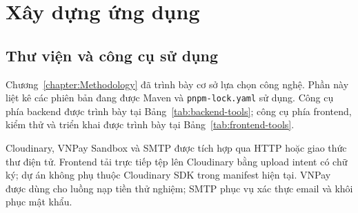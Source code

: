 \documentclass[../DoAn.tex]{subfiles}
\begin{document}
\FloatBarrier
\section{Xây dựng ứng dụng}

\subsection{Thư viện và công cụ sử dụng}

Chương~\ref{chapter:Methodology} đã trình bày cơ sở lựa chọn công nghệ. Phần này liệt kê các phiên bản đang được Maven và \texttt{pnpm-lock.yaml} sử dụng. Công cụ phía backend được trình bày tại Bảng~\ref{tab:backend-tools}; công cụ phía frontend, kiểm thử và triển khai được trình bày tại Bảng~\ref{tab:frontend-tools}.

Cloudinary, VNPay Sandbox và SMTP được tích hợp qua HTTP hoặc giao thức thư điện tử. Frontend tải trực tiếp tệp lên Cloudinary bằng upload intent có chữ ký; dự án không phụ thuộc Cloudinary SDK trong manifest hiện tại. VNPay được dùng cho luồng nạp tiền thử nghiệm; SMTP phục vụ xác thực email và khôi phục mật khẩu.
\end{document}

